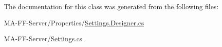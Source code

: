 The documentation for this class was generated from the following files\+:\begin{DoxyCompactItemize}
\item 
M\+A-\/\+F\+F-\/\+Server/\+Properties/\hyperlink{_settings_8_designer_8cs}{Settings.\+Designer.\+cs}\item 
M\+A-\/\+F\+F-\/\+Server/\hyperlink{_settings_8cs}{Settings.\+cs}\end{DoxyCompactItemize}
